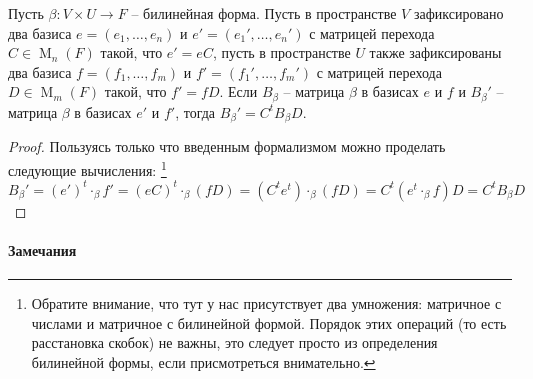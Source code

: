 \begin{claim}
Пусть $\beta\colon V\times U\to F$ -- билинейная форма.
Пусть в пространстве $V$ зафиксировано два базиса $e=(e_1,\ldots,e_n)$ и $e' = (e_1',\ldots,e_n')$ с матрицей перехода $C\in \operatorname{M}_n(F)$ такой, что $e'=eC$, пусть в пространстве $U$ также зафиксированы два базиса $f = (f_1,\ldots,f_m)$ и $f'=(f_1',\ldots,f_m')$ с матрицей перехода $D\in \operatorname{M}_m(F)$ такой, что $f' = fD$.
Если $B_\beta$ -- матрица $\beta$ в базисах $e$ и $f$ и $B_\beta'$ -- матрица $\beta$ в базисах $e'$ и $f'$, тогда $B_\beta' = C^t B_\beta D$.
\end{claim}
\begin{proof}
Пользуясь только что введенным формализмом можно проделать следующие вычисления:%
\footnote{Обратите внимание, что тут у нас присутствует два умножения: матричное с числами и матричное с билинейной формой.
Порядок этих операций (то есть расстановка скобок) не важны, это следует просто из определения билинейной формы, если присмотреться внимательно.}
\[
B_\beta' = (e')^t\cdot_\beta f' = (eC)^t \cdot_\beta (f D) = (C^t e^t) \cdot_\beta (f D) = C^t(e^t \cdot_\beta f) D = C^t B_\beta D
\]
\end{proof}

\paragraph{Замечания}

